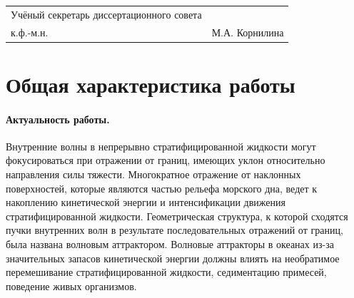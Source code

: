 \documentclass[utf8x]{G7-32} %
\begin{document}
\begin{spacing}{1.2}
\begin{flushleft}
\begin{tabular}{p{10cm} p{5cm}}
        Учёный секретарь диссертационного совета \\ к.ф.-м.н.  
    & М.А. Корнилина  
        
    \end{tabular}
\end{flushleft}
\end{spacing}
\newpage

\setcounter{page}{3}
\pagestyle{fancy}
\setcounter{secnumdepth}{-1}

\section{Общая характеристика работы}


\paragraph{Актуальность работы.}

Внутренние волны в непрерывно стратифицированной жидкости могут фокусироваться при отражении от границ, имеющих уклон относительно направления силы тяжести.
Многократное отражение от наклонных поверхностей, которые являются частью рельефа морского дна, ведет к накоплению кинетической энергии и интенсификации движения стратифицированной жидкости. 
Геометрическая структура, к которой сходятся пучки внутренних волн в результате последовательных отражений от границ, была названа волновым аттрактором.
Волновые аттракторы в океанах из-за значительных запасов кинетической энергии должны влиять на необратимое перемешивание стратифицированной жидкости, седиментацию примесей, поведение живых организмов. 
\end{document}
